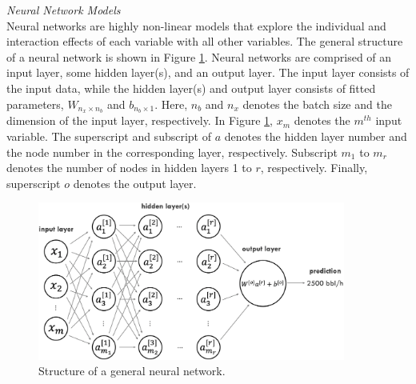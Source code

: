 %
%
\noindent
\textit{Neural Network Models} \\
Neural networks are highly non-linear models that explore the individual and interaction effects of each variable with all other variables. The general structure of a neural network is shown in Figure \ref{fig:08NN}.  Neural networks are comprised of an input layer, some hidden layer(s), and an output layer.  The input layer consists of the input data, while the hidden layer(s) and output layer consists of fitted parameters, $W_{n_x \times n_b}$ and $b_{n_b \times 1}$. Here, $n_b$ and $n_x$ denotes the batch size and the dimension of the input layer, respectively. In Figure \ref{fig:08NN}, $x_m$ denotes the $m^{th}$ input variable.  The superscript and subscript of $a$ denotes the hidden layer number and the node number in the corresponding layer, respectively.  Subscript $m_1$ to $m_r$ denotes the number of nodes in hidden layers 1 to $r$, respectively.  Finally, superscript $o$ denotes the output layer.
\begin{figure}[h]
    \centering
    \includegraphics[width=0.9\textwidth]{images/08NN.png}
    \caption{Structure of a general neural network.}
    \label{fig:08NN}
\end{figure}

